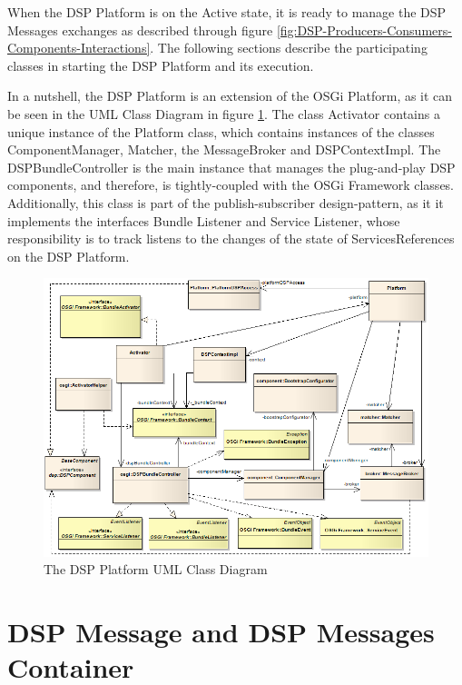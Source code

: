 When the DSP Platform is on the Active state, it is ready to manage the DSP
Messages exchanges as described through figure
\ref{fig:DSP-Producers-Consumers-Components-Interactions}. The following
sections describe the participating classes in starting the DSP Platform and
its execution.

In a nutshell, the DSP Platform is an extension of the OSGi Platform, as it can
be seen in the UML Class Diagram \cite{uml} in figure
\ref{fig:DSP-Platform-Class-Diagram-Simple}. The class Activator contains a
unique instance of the Platform class, which contains instances of the classes
ComponentManager, Matcher, the MessageBroker and DSPContextImpl. The
DSPBundleController is the main instance that manages the plug-and-play DSP
components, and therefore, is tightly-coupled with the OSGi Framework classes.
Additionally, this class is part of the publish-subscriber design-pattern, as
it it implements the interfaces Bundle Listener and Service Listener, whose
responsibility is to track listens to the changes of the state of
ServicesReferences on the DSP Platform.

\begin{figure}[!t]
  \centering
  \includegraphics[scale=0.7]{../diagrams/DSP-Platform-Class-Diagram-Simple}
  \caption{The DSP Platform UML Class Diagram}
  \label{fig:DSP-Platform-Class-Diagram-Simple}
\end{figure}

\section{DSP Message and DSP Messages Container}

